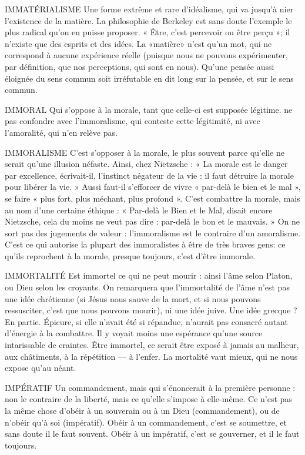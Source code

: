 IMMATÉRIALISME Une forme extrême et rare d’idéalisme, qui va jusqu’à
nier l'existence de la matière. La philosophie de Berkeley
est sans doute l’exemple le plus radical qu’on en puisse proposer. « Être,
c’est percevoir ou être perçu »; il n'existe que des esprits et des idées. La
«matière» n’est qu’un mot, qui ne correspond à aucune expérience réelle
(puisque nous ne pouvons expérimenter, par définition, que nos perceptions,
qui sont en nous). Qu’une pensée aussi éloignée du sens commun soit irréfutable
en dit long sur la pensée, et sur le sens commun.

IMMORAL Qui s’oppose à la morale, tant que celle-ci est supposée légitime.
ne pas confondre avec l’immoralisme, qui conteste cette légitimité,
ni avec l’amoralité, qui n’en relève pas.

IMMORALISME C’est s’opposer à la morale, le plus souvent parce qu’elle
ne serait qu’une illusion néfaste. Ainsi, chez Nietzsche :
« La morale est le danger par excellence, écrivait-il, l'instinct négateur de la vie :
il faut détruire la morale pour libérer la vie. » Aussi faut-il s’efforcer de vivre
« par-delà le bien et le mal », se faire « plus fort, plus méchant, plus profond ».
C’est combattre la morale, mais au nom d’une certaine éthique : « Par-delà le
Bien et le Mal, disait encore Nietzsche, cela du moins ne veut pas dire : par-delà
le bon et le mauvais. » On ne sort pas des jugements de valeur : l’immoralisme
est le contraire d’un amoralisme. C’est ce qui autorise la plupart des
immoralistes à être de très braves gens: ce qu’ils reprochent à la morale,
presque toujours, c’est d’être immorale.

IMMORTALITÉ Est immortel ce qui ne peut mourir : ainsi l’âme selon
Platon, ou Dieu selon les croyants. On remarquera que
l’immortalité de l’âme n’est pas une idée chrétienne (si Jésus nous sauve de la
mort, et si nous pouvons ressusciter, c’est que nous pouvons mourir), ni une
idée juive. Une idée grecque ? En partie. Épicure, si elle n’avait été si répandue,
n'aurait pas consacré autant d'énergie à la combattre. Il y voyait moins une
espérance qu’une source intarissable de craintes. Être immortel, ce serait être
exposé à jamais au malheur, aux châtiments, à la répétition — à l’enfer. La mortalité
vaut mieux, qui ne nous expose qu’au néant.

IMPÉRATIF Un commandement, mais qui s’énoncerait à la première personne :
non le contraire de la liberté, mais ce qu’elle s'impose
à elle-même. Ce n’est pas la même chose d’obéir à un souverain ou à un Dieu
(commandement), ou de n’obéir qu’à soi (impératif). Obéir à un commandement,
c’est se soumettre, et sans doute il le faut souvent. Obéir à un impératif,
c’est se gouverner, et il le faut toujours.

